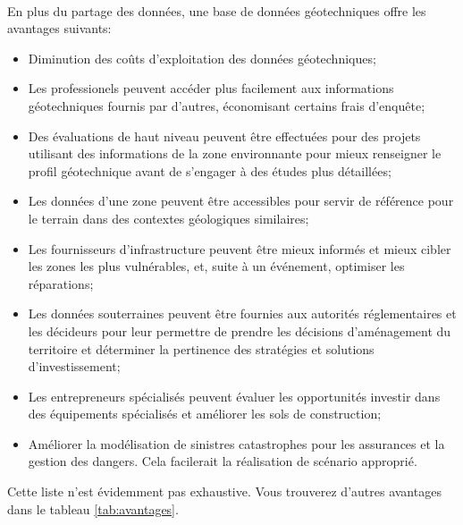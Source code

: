 \paragraph{}
En plus du partage des données, une base de données géotechniques
offre les avantages suivants:
\begin{itemize}
    \item Diminution des coûts d'exploitation des données géotechniques;
    \item Les professionels peuvent accéder plus facilement aux informations géotechniques
    fournis par d'autres, économisant certains frais d'enquête;
    \item Des évaluations de haut niveau peuvent être effectuées pour des
    projets utilisant des informations de la zone environnante pour
    mieux renseigner le profil géotechnique avant de s'engager à des
    études plus détaillées;
    \item Les données d'une zone peuvent être
    accessibles pour servir de référence pour le terrain  dans des contextes géologiques similaires;
    \item Les fournisseurs d'infrastructure peuvent être mieux informés
    et mieux cibler les zones les plus vulnérables, et, suite à un événement, optimiser les réparations;
    \item  Les données souterraines peuvent être fournies aux autorités réglementaires
    et les décideurs pour leur permettre de prendre
    les décisions d'aménagement du territoire et déterminer la pertinence
    des stratégies et solutions d'investissement;
    \item  Les entrepreneurs spécialisés peuvent évaluer les opportunités
    investir dans des équipements spécialisés et améliorer les sols de construction;
    \item Améliorer la modélisation de sinistres catastrophes pour les assurances et
    la gestion des dangers. Cela facilerait la réalisation de scénario approprié.    
\end{itemize}
Cette liste n'est évidemment pas exhaustive. Vous trouverez d'autres avantages dans le tableau \ref{tab:avantages}.


